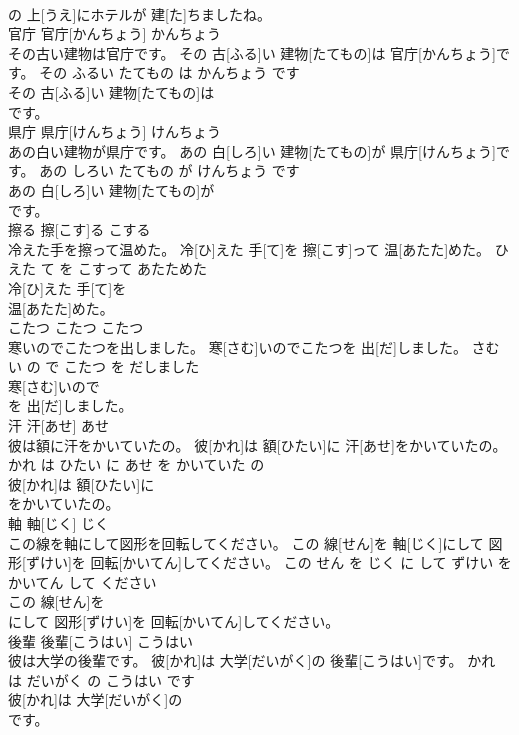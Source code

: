 \documentclass[8pt]{extreport}
\begin{document}
\begin{CJK}{UTF8}{min}
\\	の 上[うえ]にホテルが 建[た]ちましたね。			
\\	官庁	官庁[かんちょう]	かんちょう	
\\	その古い建物は官庁です。	その 古[ふる]い 建物[たてもの]は 官庁[かんちょう]です。	その ふるい たてもの は かんちょう です	
\\	その 古[ふる]い 建物[たてもの]は
\\	です。			
\\	県庁	県庁[けんちょう]	けんちょう	
\\	あの白い建物が県庁です。	あの 白[しろ]い 建物[たてもの]が 県庁[けんちょう]です。	あの しろい たてもの が けんちょう です	
\\	あの 白[しろ]い 建物[たてもの]が
\\	です。			
\\	擦る	擦[こす]る	こする	
\\	冷えた手を擦って温めた。	冷[ひ]えた 手[て]を 擦[こす]って 温[あたた]めた。	ひえた て を こすって あたためた	
\\	冷[ひ]えた 手[て]を
\\	温[あたた]めた。			
\\	こたつ	こたつ	こたつ	
\\	寒いのでこたつを出しました。	寒[さむ]いのでこたつを 出[だ]しました。	さむい の で こたつ を だしました	
\\	寒[さむ]いので
\\	を 出[だ]しました。			
\\	汗	汗[あせ]	あせ	
\\	彼は額に汗をかいていたの。	彼[かれ]は 額[ひたい]に 汗[あせ]をかいていたの。	かれ は ひたい に あせ を かいていた の	
\\	彼[かれ]は 額[ひたい]に
\\	をかいていたの。			
\\	軸	軸[じく]	じく	
\\	この線を軸にして図形を回転してください。	この 線[せん]を 軸[じく]にして 図形[ずけい]を 回転[かいてん]してください。	この せん を じく に して ずけい を かいてん して ください	
\\	この 線[せん]を
\\	にして 図形[ずけい]を 回転[かいてん]してください。			
\\	後輩	後輩[こうはい]	こうはい	
\\	彼は大学の後輩です。	彼[かれ]は 大学[だいがく]の 後輩[こうはい]です。	かれ は だいがく の こうはい です	
\\	彼[かれ]は 大学[だいがく]の
\\	です。			

\end{CJK}
\end{document}

